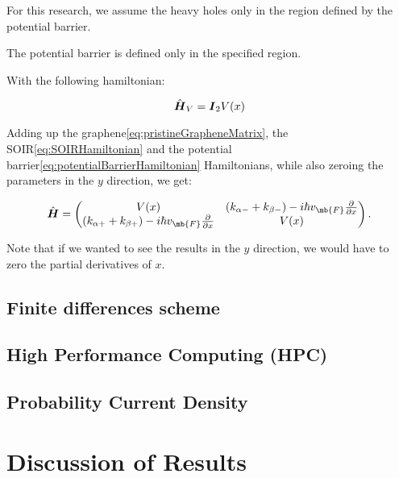 \documentclass[twocolumn]{revtex4-2}
\newcommand{\bn}[1]{\mbox{\boldmath $#1$}}
\begin{document}
    For this research, we assume the heavy holes only in the region defined by the potential barrier.

    The potential barrier is defined only in the specified region.


    With the following hamiltonian:

    \begin{equation}
        \label{eq:potentialBarrierHamiltonian}
        \hat{\bn{H}}_V=\bn{I}_2 V(x)
    \end{equation}

    Adding up the graphene\eqref{eq:pristineGrapheneMatrix}, the SOIR\eqref{eq:SOIRHamiltonian} and the potential barrier\eqref{eq:potentialBarrierHamiltonian} Hamiltonians, while also zeroing the parameters in the $y$ direction, we get:

    \begin{equation}
        \label{eq:hybridHamiltonian}
        \hat{\bn{H}}=
        \begin{pmatrix}
            V(x) & \left(k_{\alpha-}+k_{\beta-}\right) - i\hbar v_{\mb{\tiny F}}\frac{\partial}{\partial x}\\
            \left(k_{\alpha+}+k_{\beta+}\right) - i\hbar v_{\mb{\tiny F}}\frac{\partial}{\partial x} & V(x)
        \end{pmatrix}.
    \end{equation}

    Note that if we wanted to see the results in the $y$ direction, we would have to zero the partial derivatives of $x$.

    \subsection{Finite differences scheme}\label{subsec:finite-differences-scheme}

    \subsection{High Performance Computing (HPC)}\label{subsec:high-performance-computing-(hpc)}

    \subsection{Probability Current Density}\label{subsec:probability-current-density}


    \section{Discussion of Results}\label{sec:discussion-of-results}
\end{document}
